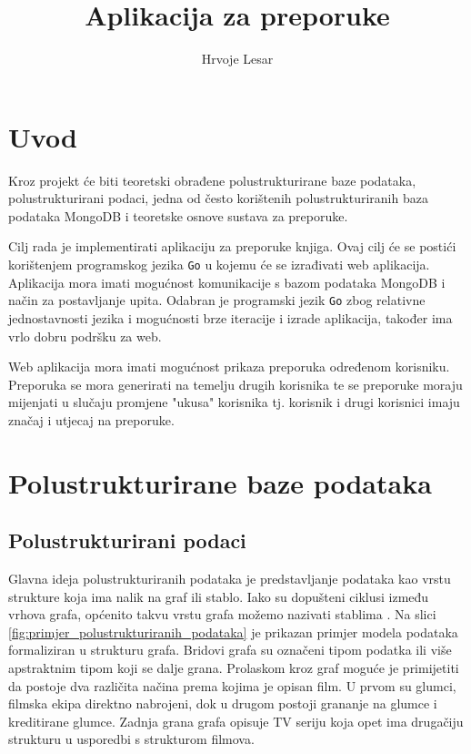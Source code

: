 \documentclass[]{foi}
\title{Aplikacija za preporuke}
\author{Hrvoje Lesar}
\begin{document}
\maketitle

\tableofcontents

\makeatletter {} \makeatother
\pagestyle{plain}

\chapter{Uvod}

Kroz projekt će biti teoretski obrađene polustrukturirane baze podataka, polustrukturirani podaci, jedna od 
često korištenih polustrukturiranih baza podataka MongoDB i teoretske osnove sustava za preporuke.

Cilj rada je implementirati aplikaciju za preporuke knjiga. Ovaj cilj će se postići korištenjem programskog
jezika \texttt{Go} u kojemu će se izrađivati web aplikacija. Aplikacija mora imati mogućnost komunikacije
s bazom podataka MongoDB i način za postavljanje upita. Odabran je programski jezik \texttt{Go} zbog relativne
jednostavnosti jezika i mogućnosti brze iteracije i izrade aplikacija, također ima vrlo dobru podršku za web.

Web aplikacija mora imati mogućnost prikaza preporuka određenom korisniku. Preporuka se mora generirati na temelju
drugih korisnika te se preporuke moraju mijenjati u slučaju promjene "ukusa" korisnika tj. korisnik i drugi
korisnici imaju značaj i utjecaj na preporuke.

\chapter{Polustrukturirane baze podataka}

\section{Polustrukturirani podaci}

Glavna ideja polustrukturiranih podataka je predstavljanje podataka kao vrstu strukture koja ima nalik na graf ili stablo.
Iako su dopušteni ciklusi između vrhova grafa, općenito takvu vrstu grafa možemo nazivati stablima \cite{buneman1997semistructured}.
Na slici \ref{fig:primjer_polustrukturiranih_podataka} je prikazan primjer modela podataka formaliziran u strukturu grafa.
Bridovi grafa su označeni tipom podatka ili više apstraktnim tipom koji se dalje grana. Prolaskom kroz graf moguće je
primijetiti da postoje dva različita načina prema kojima je opisan film. U prvom su glumci, filmska ekipa direktno nabrojeni,
dok u drugom postoji grananje na glumce i kreditirane glumce. Zadnja grana grafa opisuje TV seriju koja opet ima drugačiju
strukturu u usporedbi s strukturom filmova.
\end{document}
